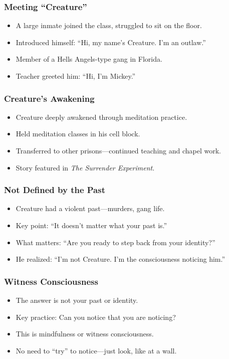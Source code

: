 \begin{frame}[fragile]\frametitle{Meeting “Creature”}
  \begin{itemize}
    \item A large inmate joined the class, struggled to sit on the floor.
    \item Introduced himself: “Hi, my name’s Creature. I’m an outlaw.”
    \item Member of a Hells Angels-type gang in Florida.
    \item Teacher greeted him: “Hi, I’m Mickey.”
  \end{itemize}
\end{frame}

\begin{frame}[fragile]\frametitle{Creature’s Awakening}
  \begin{itemize}
    \item Creature deeply awakened through meditation practice.
    \item Held meditation classes in his cell block.
    \item Transferred to other prisons—continued teaching and chapel work.
    \item Story featured in \textit{The Surrender Experiment}.
  \end{itemize}
\end{frame}

\begin{frame}[fragile]\frametitle{Not Defined by the Past}
  \begin{itemize}
    \item Creature had a violent past—murders, gang life.
    \item Key point: “It doesn’t matter what your past is.”
    \item What matters: “Are you ready to step back from your identity?”
    \item He realized: “I’m not Creature. I’m the consciousness noticing him.”
  \end{itemize}
\end{frame}

\begin{frame}[fragile]\frametitle{Witness Consciousness}
  \begin{itemize}
    \item The answer is not your past or identity.
    \item Key practice: Can you notice that you are noticing?
    \item This is mindfulness or witness consciousness.
    \item No need to “try” to notice—just look, like at a wall.
  \end{itemize}
\end{frame}


